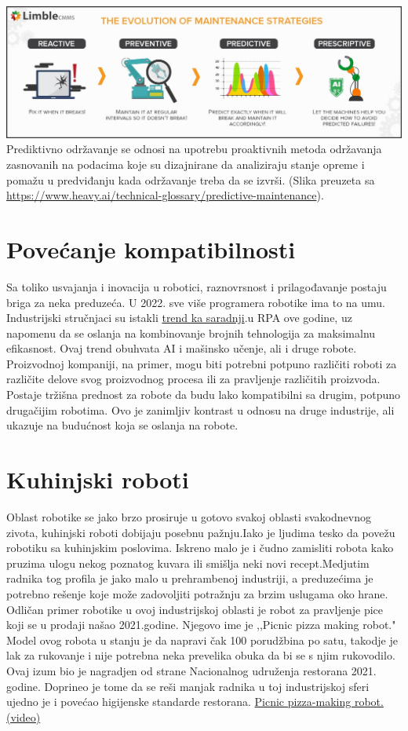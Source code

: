 \documentclass{article}
\begin{document}
	
	\vspace{2cm}
	\includegraphics[scale=0.37]{dijagram.jpeg}
	Prediktivno održavanje se odnosi na upotrebu proaktivnih metoda održavanja zasnovanih na podacima koje su dizajnirane da analiziraju stanje opreme i pomažu u predviđanju kada održavanje treba da se izvrši. (Slika preuzeta sa \url{https://www.heavy.ai/technical-glossary/predictive-maintenance}).

	\section{Povećanje kompatibilnosti}
	Sa toliko usvajanja i inovacija u robotici, raznovrsnost i prilagođavanje postaju briga za neka preduzeća. U 2022. sve više programera robotike ima to na umu. Industrijski stručnjaci su istakli
	\href{https://enterprisersproject.com/article/2022/1/4-robotic-process-automation-rpa-trends-watch-2022}{trend ka saradnji}.u RPA ove godine, uz napomenu da se oslanja na kombinovanje brojnih tehnologija za maksimalnu efikasnost.
	Ovaj trend obuhvata AI i mašinsko učenje, ali i druge robote. Proizvodnoj kompaniji, na primer, mogu biti potrebni potpuno različiti roboti za različite delove svog proizvodnog procesa ili za pravljenje različitih proizvoda. Postaje tržišna prednost za robote da budu lako kompatibilni sa drugim, potpuno drugačijim robotima. Ovo je zanimljiv kontrast u odnosu na druge industrije, ali ukazuje na budućnost koja se oslanja na robote.
	\cite{robotics2022}
\section{Kuhinjski roboti}
Oblast robotike se jako brzo prosiruje u gotovo svakoj oblasti svakodnevnog zivota, kuhinjski roboti dobijaju posebnu pažnju.Iako je ljudima tesko da povežu robotiku sa kuhinjskim poslovima. Iskreno malo je i čudno zamisliti robota kako pruzima ulogu nekog poznatog kuvara ili smišlja neki novi recept.Medjutim radnika tog profila je jako malo u prehrambenoj industriji, a preduzećima je potrebno rešenje koje može zadovoljiti potražnju za brzim uslugama oko hrane. Odličan primer robotike u ovoj industrijskoj oblasti je robot za pravljenje pice koji se u prodaji našao 2021.godine. Njegovo ime je ,,Picnic pizza making robot." Model ovog robota u stanju je da napravi čak 100 porudžbina po satu, takodje je lak za rukovanje i nije potrebna neka prevelika obuka da bi se s njim rukovodilo. Ovaj izum bio je nagradjen od strane Nacionalnog udruženja restorana 2021. godine. Doprineo je tome da se reši manjak radnika u toj industrijskoj sferi ujedno je i povećao higijenske standarde restorana.
\href{https://www.youtube.com/embed/_dCC96BOlDU}{Picnic pizza-making robot. (video)}
\end{document}
